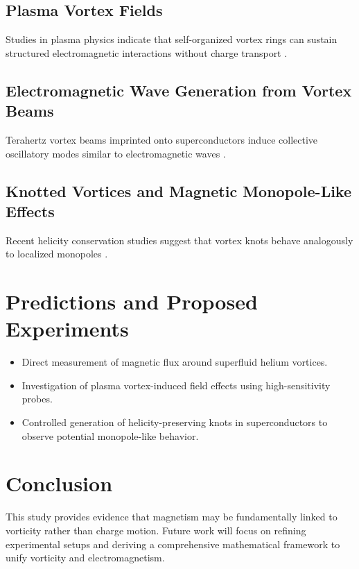 \subsection{Plasma Vortex Fields}
Studies in plasma physics indicate that self-organized vortex rings can sustain structured electromagnetic interactions without charge transport \cite{plasma_vortex_flows}.

\subsection{Electromagnetic Wave Generation from Vortex Beams}
Terahertz vortex beams imprinted onto superconductors induce collective oscillatory modes similar to electromagnetic waves \cite{higgs_waves_vortex}.

\subsection{Knotted Vortices and Magnetic Monopole-Like Effects}
Recent helicity conservation studies suggest that vortex knots behave analogously to localized monopoles \cite{collected_helicity_papers}.

\section{Predictions and Proposed Experiments}
\begin{itemize}
    \item Direct measurement of magnetic flux around superfluid helium vortices.
    \item Investigation of plasma vortex-induced field effects using high-sensitivity probes.
    \item Controlled generation of helicity-preserving knots in superconductors to observe potential monopole-like behavior.
\end{itemize}

\section{Conclusion}
This study provides evidence that magnetism may be fundamentally linked to vorticity rather than charge motion. Future work will focus on refining experimental setups and deriving a comprehensive mathematical framework to unify vorticity and electromagnetism.




